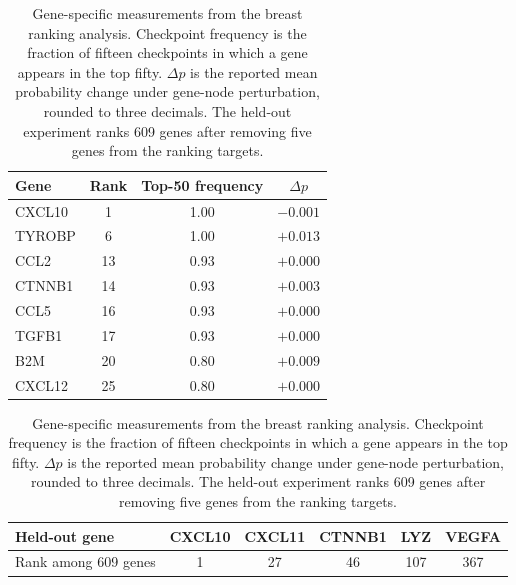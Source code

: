 \begin{table}[!ht]
\centering
\caption{Gene-specific measurements from the breast ranking analysis. Checkpoint frequency
is the fraction of fifteen checkpoints in which a gene appears in the top fifty.
$\Delta p$ is the reported mean probability change under gene-node perturbation, rounded
to three decimals. The held-out experiment ranks 609 genes after removing five genes
from the ranking targets.}
\label{tab:gene_examples}
\small
\begin{tabularx}{\linewidth}{@{}Xccc@{}}
\toprule Gene & Rank & Top-50 frequency & $\Delta p$ \\
\midrule
CXCL10 & 1 & 1.00 & $-0.001$ \\
TYROBP & 6 & 1.00 & $+0.013$ \\
CCL2 & 13 & 0.93 & $+0.000$ \\
CTNNB1 & 14 & 0.93 & $+0.003$ \\
CCL5 & 16 & 0.93 & $+0.000$ \\
TGFB1 & 17 & 0.93 & $+0.000$ \\
B2M & 20 & 0.80 & $+0.009$ \\
CXCL12 & 25 & 0.80 & $+0.000$ \\
\bottomrule
\end{tabularx}
\medskip
\begin{tabularx}{\linewidth}{@{}Xccccc@{}}
\toprule Held-out gene & CXCL10 & CXCL11 & CTNNB1 & LYZ & VEGFA \\
\midrule
Rank among 609 genes & 1 & 27 & 46 & 107 & 367 \\
\bottomrule
\end{tabularx}
\end{table}

